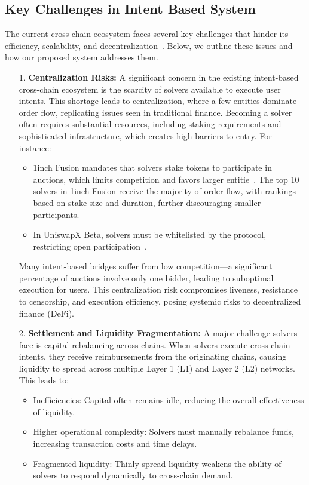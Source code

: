 \subsection{Key Challenges in Intent Based System}

The current cross-chain ecosystem faces several key challenges that hinder its efficiency, scalability, and decentralization~\cite{omnichain}. Below, we outline these issues and how our proposed system addresses them.

\begin{itemize}
    \item[1.] \textbf{Centralization Risks:} A significant concern in the existing intent-based cross-chain ecosystem is the scarcity of solvers available to execute user intents. This shortage leads to centralization, where a few entities dominate order flow, replicating issues seen in traditional finance. Becoming a solver often requires substantial resources, including staking requirements and sophisticated infrastructure, which creates high barriers to entry. For instance:
    \begin{itemize}
        \item 1inch Fusion mandates that solvers stake tokens to participate in auctions, which limits competition and favors larger entitie~\cite{lifi}. The top 10 solvers in 1inch Fusion receive the majority of order flow, with rankings based on stake size and duration, further discouraging smaller participants.
        \item In UniswapX Beta, solvers must be whitelisted by the protocol, restricting open participation~\cite{lifi}.
    \end{itemize}

    Many intent-based bridges suffer from low competition—a significant percentage of auctions involve only one bidder, leading to suboptimal execution for users. This centralization risk compromises liveness, resistance to censorship, and execution efficiency, posing systemic risks to decentralized finance (DeFi).

    \item[2.] \textbf{Settlement and Liquidity Fragmentation:} A major challenge solvers face is capital rebalancing across chains. When solvers execute cross-chain intents, they receive reimbursements from the originating chains, causing liquidity to spread across multiple Layer 1 (L1) and Layer 2 (L2) networks. This leads to:
    
    \begin{itemize}
        \item Inefficiencies: Capital often remains idle, reducing the overall effectiveness of liquidity.
        \item Higher operational complexity: Solvers must manually rebalance funds, increasing transaction costs and time delays.
        \item Fragmented liquidity: Thinly spread liquidity weakens the ability of solvers to respond dynamically to cross-chain demand.
    \end{itemize}


\end{itemize}
